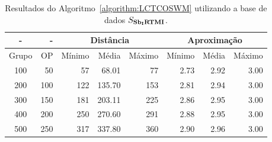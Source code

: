 \begin{table}[!htb]
  \caption{Resultados do Algoritmo~\ref{algorithm:LCTCOSWM} utilizando a base de dados $S_{\textbf{Sb\textsubscript{I}RTMI}}{}$.}
  \label{table:FTGAXJEH}
  \centering
  \begin{tabular}{|c|r|r|r|r|r|r|r|}
    \hline
      -      &  -   & \multicolumn{3}{c|}{Distância}             & \multicolumn{3}{c|}{Aproximação}           \\ \hline
    Grupo    & OP   & Mínimo       & Média        & Máximo       & Mínimo       & Média        & Máximo       \\ \hline  
    100      & 50   & 57           & 68.01        & 77           & 2.73         & 2.92         & 3.00         \\ \hline
    200      & 100  & 122          & 135.70       & 153          & 2.81         & 2.94         & 3.00         \\ \hline
    300      & 150  & 181          & 203.11       & 225          & 2.86         & 2.95         & 3.00         \\ \hline
    400      & 200  & 250          & 270.60       & 291          & 2.88         & 2.95         & 3.00         \\ \hline
    500      & 250  & 317          & 337.80       & 360          & 2.90         & 2.96         & 3.00         \\ \hline    
  \end{tabular}
\end{table}